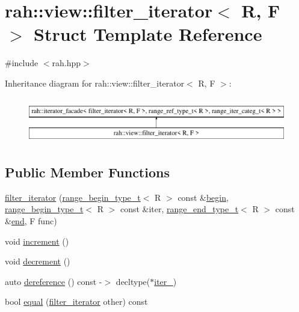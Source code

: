 \hypertarget{structrah_1_1view_1_1filter__iterator}{}\section{rah\+::view\+::filter\+\_\+iterator$<$ R, F $>$ Struct Template Reference}
\label{structrah_1_1view_1_1filter__iterator}


{\ttfamily \#include $<$rah.\+hpp$>$}

Inheritance diagram for rah\+::view\+::filter\+\_\+iterator$<$ R, F $>$\+:\begin{figure}[H]
\begin{center}
\leavevmode
\includegraphics[height=1.996435cm]{structrah_1_1view_1_1filter__iterator}
\end{center}
\end{figure}
\subsection*{Public Member Functions}
\begin{DoxyCompactItemize}
\item 
\mbox{\hyperlink{structrah_1_1view_1_1filter__iterator_a31543c024a816c4f3e8fc8937b2a9214}{filter\+\_\+iterator}} (\mbox{\hyperlink{namespacerah_a28aff4eeddcece6be65ff0b956d32d4a}{range\+\_\+begin\+\_\+type\+\_\+t}}$<$ R $>$ const \&\mbox{\hyperlink{namespacerah_a2c4a19e57cc4e0753e93830f247def6d}{begin}}, \mbox{\hyperlink{namespacerah_a28aff4eeddcece6be65ff0b956d32d4a}{range\+\_\+begin\+\_\+type\+\_\+t}}$<$ R $>$ const \&iter, \mbox{\hyperlink{namespacerah_a9657e24ae477f4482225b133fe286b65}{range\+\_\+end\+\_\+type\+\_\+t}}$<$ R $>$ const \&\mbox{\hyperlink{namespacerah_aaddd1442cd76b96876e692cdefe7261d}{end}}, F func)
\item 
void \mbox{\hyperlink{structrah_1_1view_1_1filter__iterator_a63278a452be5e546e6fb3aa0b1a90bfb}{increment}} ()
\item 
void \mbox{\hyperlink{structrah_1_1view_1_1filter__iterator_aed445498ffbec0c3e782ddc17314b677}{decrement}} ()
\item 
auto \mbox{\hyperlink{structrah_1_1view_1_1filter__iterator_a14c5ce038b3e25230cb8e837705f56db}{dereference}} () const -\/$>$ decltype($\ast$\mbox{\hyperlink{structrah_1_1view_1_1filter__iterator_ad4016a695a004f72b1a942abd9193c71}{iter\+\_\+}})
\item 
bool \mbox{\hyperlink{structrah_1_1view_1_1filter__iterator_a4ab0c322842146d3011ae7c88deb82f7}{equal}} (\mbox{\hyperlink{structrah_1_1view_1_1filter__iterator}{filter\+\_\+iterator}} other) const
\end{DoxyCompactItemize}
